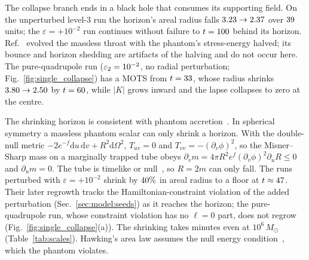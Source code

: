 \documentclass[twocolumn,floatfix,aps,prd,superscriptaddress,nofootinbib,showkeys]{revtex4-2}
\begin{document}
The collapse branch ends in a black hole that consumes its supporting field. On the unperturbed level-3 run the horizon's areal radius falls $3.23\to2.37$ over $39$ units; the $\varepsilon=+10^{-2}$ run continues without failure to $t=100$ behind its horizon. Ref.~\cite{shirokov2026} evolved the massless throat with the phantom's stress-energy halved; its bounce and horizon shedding are artifacts of the halving and do not occur here. The pure-quadrupole run ($\varepsilon_2=10^{-2}$, no radial perturbation; Fig.~\ref{fig:single_collapse}) has a MOTS from $t=33$, whose radius shrinks $3.80\to2.50$ by $t=60$, while $|K|$ grows inward and the lapse collapses to zero at the centre.

The shrinking horizon is consistent with phantom accretion~\cite{babichev2004,gao2008}. In spherical symmetry a massless phantom scalar can only shrink a horizon. With the double-null metric $-2e^{-f}\mathrm{d}u\,\mathrm{d}v+R^2\mathrm{d}\Omega^2$, $T_{uv}=0$ and $T_{vv}=-(\partial_v\phi)^2$, so the Misner--Sharp mass on a marginally trapped tube obeys $\partial_v m=4\pi R^2e^{f}(\partial_v\phi)^2\partial_uR\le0$ and $\partial_u m=0$. The tube is timelike or null~\cite{hayward1996,hayward1994}, so $R=2m$ can only fall. The runs perturbed with $\varepsilon=+10^{-2}$ shrink by $40\%$ in areal radius to a floor at $t\approx47$. Their later regrowth tracks the Hamiltonian-constraint violation of the added perturbation (Sec.~\ref{sec:model:seeds}) as it reaches the horizon; the pure-quadrupole run, whose constraint violation has no $\ell=0$ part, does not regrow (Fig.~\ref{fig:single_collapse}(a)). The shrinking takes minutes even at $10^{6}\,M_\odot$ (Table~\ref{tab:scales}). Hawking's area law assumes the null energy condition~\cite{hawking1971,ashtekar_krishnan2004}, which the phantom violates.
\end{document}
